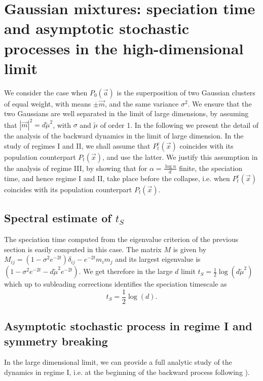\documentclass[10pt,twocolumn]{article}
\newcommand{\vx}{\vec x}
\begin{document}
\section{Gaussian mixtures: speciation time and asymptotic stochastic processes in the high-dimensional limit }
We consider the case when $P_0(\vec a)$ is the superposition of two Gaussian clusters of equal weight, with means $\pm \vec m$, and the same variance $\sigma^2$.
We ensure that the two Gaussians are well separated in the limit of large dimensions, by assuming that  $|\vec m|^2 =d\tilde \mu^2$, with  $\sigma$ and $\tilde \mu$  of order 1. In the following we present the detail of the analysis of the backward dynamics in the limit of large dimension. In the study of regimes I and II, we shall assume that $P_t^e(\vx)$ coincides with its population counterpart $P_t(\vx)$, and use the latter. We justify this assumption in the analysis of regime III, by showing that for $\alpha=\frac{\log n}{d}$ finite, the speciation time, and hence regime I and II, take place before the collapse, i.e. when $P_t^e(\vx)$ coincides with its population counterpart $P_t(\vx)$.  

\subsection{Spectral estimate of $t_S$}
The speciation time computed from the eigenvalue criterion of the previous section is easily computed in this case. The matrix $M$ is given by
$M_{ij}=(1-\sigma^2 e^{-2t}) \delta_{ij}-e^{-2t} m_i m_j$
and its largest eigenvalue is $(1-\sigma^2 e^{-2t}- d\tilde \mu^2 e^{-2t})$. We get therefore in the large $d$ limit $t_S=\frac{1}{2}\log(d\tilde\mu^2)$
which up to subleading corrections identifies the speciation timescale as $$t_S=\frac{1}{2}\log(d).$$

\subsection{Asymptotic stochastic process in regime I and symmetry breaking}
In the large dimensional limit, we can provide a full analytic study of the dynamics in regime I, i.e. at the beginning of the backward process following \cite{GBM}). 
\end{document}
